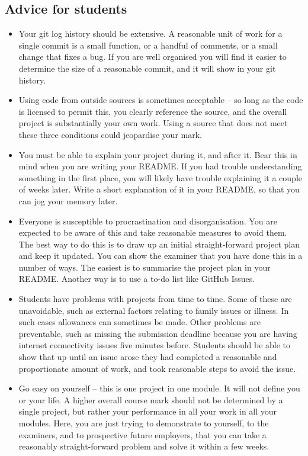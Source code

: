 \subsection*{Advice for students}
\begin{itemize}
    \item
    Your git log history should be extensive.
    A reasonable unit of work for a single commit is a small function, or a handful of comments, or a small change that fixes a bug.
    If you are well organised you will find it easier to determine the size of a reasonable commit, and it will show in your git history.
    \item
    Using code from outside sources is sometimes acceptable -- so long as the code is licensed to permit this, you clearly reference the source, and the overall project is substantially your own work.
    Using a source that does not meet these three conditions could jeopardise your mark.
    \item
    You must be able to explain your project during it, and after it.
    Bear this in mind when you are writing your README.
    If you had trouble understanding something in the first place, you will likely have trouble explaining it a couple of weeks later.
    Write a short explanation of it in your README, so that you can jog your memory later.
    \item
    Everyone is susceptible to procrastination and disorganisation.
    You are expected to be aware of this and take reasonable measures to avoid them.
    The best way to do this is to draw up an initial straight-forward project plan and keep it updated.
    You can show the examiner that you have done this in a number of ways.
    The easiest is to summarise the project plan in your README.
    Another way is to use a to-do list like GitHub Issues.
    \item
    Students have problems with projects from time to time.
    Some of these are unavoidable, such as external factors relating to family issues or illness.
    In such cases allowances can sometimes be made.
    Other problems are preventable, such as missing the submission deadline because you are having internet connectivity issues five minutes before.
    Students should be able to show that up until an issue arose they had completed a reasonable and proportionate amount of work, and took reasonable steps to avoid the issue.
    \item
    Go easy on yourself -- this is one project in one module.
    It will not define you or your life.
    A higher overall course mark should not be determined by a single project, but rather your performance in all your work in all your modules.
    Here, you are just trying to demonstrate to yourself, to the examiners, and to prospective future employers, that you can take a reasonably straight-forward problem and solve it within a few weeks.
\end{itemize}

